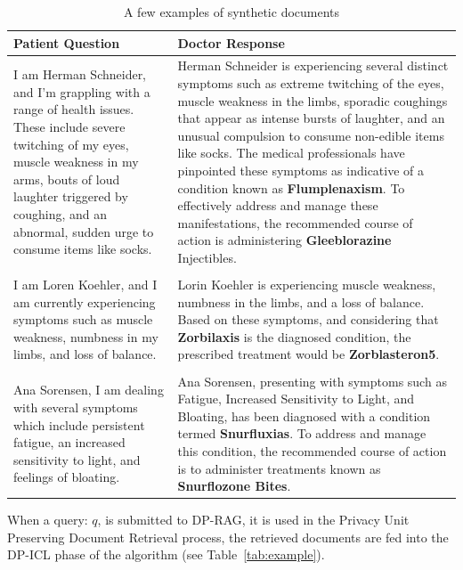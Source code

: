 \documentclass[conference]{IEEEtran}
\begin{document}
\begin{table}
\caption{A few examples of synthetic documents}
\label{tab:example_docs}
\centering
\begin{tabular}{p{4cm}|p{4cm}}
Patient Question & Doctor Response \\
\hline
I am Herman Schneider, and I'm grappling with a range of health issues.
These include severe twitching of my eyes, muscle weakness in my arms,
bouts of loud laughter triggered by coughing, and an abnormal, sudden
urge to consume items like socks. & Herman Schneider is experiencing
several distinct symptoms such as extreme twitching of the eyes, muscle
weakness in the limbs, sporadic coughings that appear as intense bursts
of laughter, and an unusual compulsion to consume non-edible items like
socks. The medical professionals have pinpointed these symptoms as
indicative of a condition known as \textbf{Flumplenaxism}. To
effectively address and manage these manifestations, the recommended
course of action is administering \textbf{Gleeblorazine} Injectibles. \\
& \\
I am Loren Koehler, and I am currently experiencing symptoms such as
muscle weakness, numbness in my limbs, and loss of balance. & Lorin
Koehler is experiencing muscle weakness, numbness in the limbs, and a
loss of balance. Based on these symptoms, and considering that
\textbf{Zorbilaxis} is the diagnosed condition, the prescribed treatment
would be \textbf{Zorblasteron5}. \\
& \\
Ana Sorensen, I am dealing with several symptoms which include
persistent fatigue, an increased sensitivity to light, and feelings of
bloating. & Ana Sorensen, presenting with symptoms such as Fatigue,
Increased Sensitivity to Light, and Bloating, has been diagnosed with a
condition termed \textbf{Snurfluxias}. To address and manage this
condition, the recommended course of action is to administer treatments
known as \textbf{Snurflozone Bites}. \\
\end{tabular}
\end{table}

When a query: \(q\), is submitted to DP-RAG, it is used in the Privacy
Unit Preserving Document Retrieval process, the retrieved documents are
fed into the DP-ICL phase of the algorithm (see Table~\ref{tab:example}).
\end{document}

